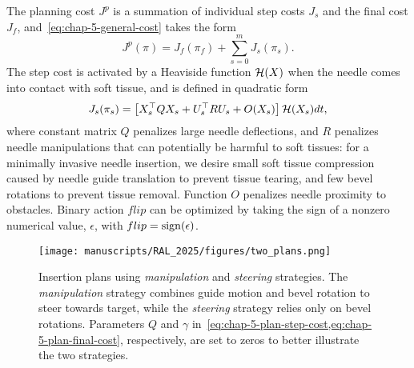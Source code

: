 The planning cost $J^p$ is a summation of individual step costs $J_s$ and the final cost $J_{f}$, and~\cref{eq:chap-5-general-cost} takes the form
\begin{equation}
  J^p(\pi) = J_{f}(\pi_f) + \sum_{s=0}^mJ_s(\pi_s).
\end{equation}
The step cost is activated by a Heaviside function $\mathcal{H}(X)$ when the needle comes into contact with soft tissue, and is defined in quadratic form
\begin{equation}
  \label{eq:chap-5-plan-step-cost}
  J_s(\pi_s) = \left[ X_s^{\top}QX_s + U_s^{\top}RU_s + O(X_s)\right]\mathcal{H}(X_s)dt,
\end{equation}
where constant matrix $Q$ penalizes large needle deflections, and $R$ penalizes needle manipulations that can potentially be harmful to soft tissues: for a minimally invasive needle insertion, we desire small soft tissue compression caused by needle guide translation to prevent tissue tearing, and few bevel rotations to prevent tissue removal. Function $O$ penalizes needle proximity to obstacles. Binary action $flip$ can be optimized by taking the sign of a nonzero numerical value, $\epsilon$, with $flip = \operatorname{sign}({\epsilon})$.

\begin{figure}[h]
  \centering
  \texttt{[image: manuscripts/RAL\_2025/figures/two\_plans.png]}
  \caption{Insertion plans using \textit{manipulation} and \textit{steering} strategies. The \textit{manipulation} strategy combines guide motion and bevel rotation to steer towards target, while the \textit{steering} strategy relies only on bevel rotations. Parameters $Q$ and $\gamma$ in~\cref{eq:chap-5-plan-step-cost,eq:chap-5-plan-final-cost}, respectively, are set to zeros to better illustrate the two strategies.}
  \label{fig:chap-5-two-plans}
\end{figure}

